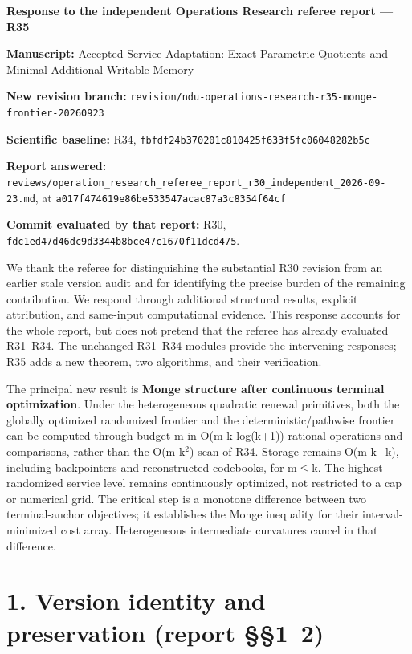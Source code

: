 \documentclass[11pt,letterpaper]{article}
\begin{document}
\begin{center}\Large\bfseries Response to the independent Operations Research referee report --- R35\end{center}

\textbf{Manuscript:} Accepted Service Adaptation: Exact Parametric Quotients and Minimal Additional Writable Memory\par 
\textbf{New revision branch:} \nolinkurl{revision/ndu-operations-research-r35-monge-frontier-20260923}\par 
\textbf{Scientific baseline:} R34, \nolinkurl{fbfdf24b370201c810425f633f5fc06048282b5c}\par 
\textbf{Report answered:} \nolinkurl{reviews/operation_research_referee_report_r30_independent_2026-09-23.md}, at \nolinkurl{a017f474619e86be533547acac87a3c8354f64cf}\par 
\textbf{Commit evaluated by that report:} R30, \nolinkurl{fdc1ed47d46dc9d3344b8bce47c1670f11dcd475}.


We thank the referee for distinguishing the substantial R30 revision from an earlier stale version audit and for identifying the precise burden of the remaining contribution. We respond through additional structural results, explicit attribution, and same-input computational evidence. This response accounts for the whole report, but does not pretend that the referee has already evaluated R31--R34. The unchanged R31--R34 modules provide the intervening responses; R35 adds a new theorem, two algorithms, and their verification.


The principal new result is \textbf{Monge structure after continuous terminal optimization}. Under the heterogeneous quadratic renewal primitives, both the globally optimized randomized frontier and the deterministic/pathwise frontier can be computed through budget m in O(m k log(k+1)) rational operations and comparisons, rather than the O(m k$^2$) scan of R34. Storage remains O(m k+k), including backpointers and reconstructed codebooks, for m$\leq$k. The highest randomized service level remains continuously optimized, not restricted to a cap or numerical grid. The critical step is a monotone difference between two terminal-anchor objectives; it establishes the Monge inequality for their interval-minimized cost array. Heterogeneous intermediate curvatures cancel in that difference.


\section*{1. Version identity and preservation (report §§1--2)}
\end{document}
